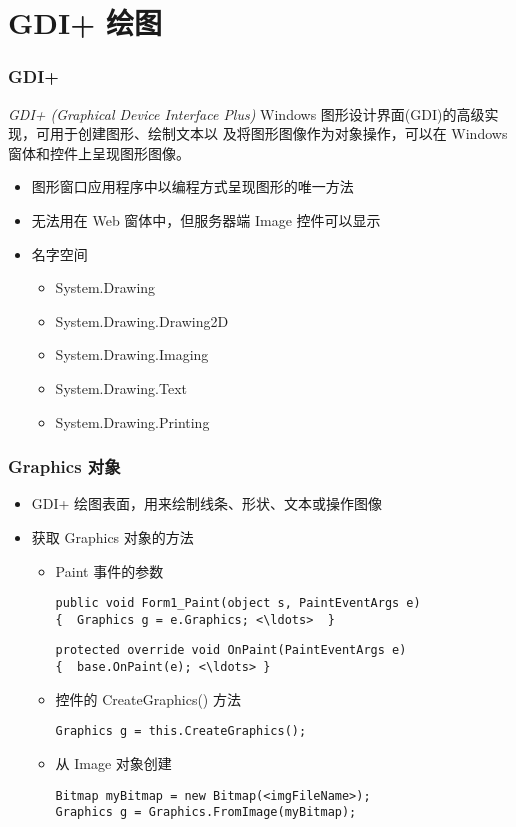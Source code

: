 
\section{GDI+ 绘图}

\begin{frame}
\frametitle{GDI+}
\begin{block}{\textit{GDI+ (Graphical Device Interface Plus)}}
  \CJKindent Windows 图形设计界面(GDI)的高级实现，可用于创建图形、绘制文本以
  及将图形图像作为对象操作，可以在 Windows 窗体和控件上呈现图形图像。
\end{block}

\begin{itemize}
\item 图形窗口应用程序中以编程方式呈现图形的唯一方法
\item 无法用在 Web 窗体中，但服务器端 Image 控件可以显示
\item 名字空间

\begin{itemize}
\item System.Drawing 
\item System.Drawing.Drawing2D
\item System.Drawing.Imaging
\item System.Drawing.Text
\item System.Drawing.Printing
\end{itemize}
\end{itemize}
\end{frame}

\begin{frame}[fragile]
\frametitle{Graphics 对象}
\begin{itemize}
\item GDI+ 绘图表面，用来绘制线条、形状、文本或操作图像
\item 获取 Graphics 对象的方法
\begin{itemize}
\item Paint 事件的参数
\begin{lstlisting}[escapeinside=<>]
public void Form1_Paint(object s, PaintEventArgs e) 
{  Graphics g = e.Graphics; <\ldots>  }
\end{lstlisting}
\begin{lstlisting}[escapeinside=<>]
protected override void OnPaint(PaintEventArgs e)
{  base.OnPaint(e); <\ldots> }
\end{lstlisting}
\item 控件的 CreateGraphics() 方法
\begin{lstlisting}
Graphics g = this.CreateGraphics();
\end{lstlisting}
\item 从 Image 对象创建
\begin{lstlisting}[escapeinside=<>]
Bitmap myBitmap = new Bitmap(<imgFileName>);
Graphics g = Graphics.FromImage(myBitmap);
\end{lstlisting}
\end{itemize}
\end{itemize}
\end{frame}


